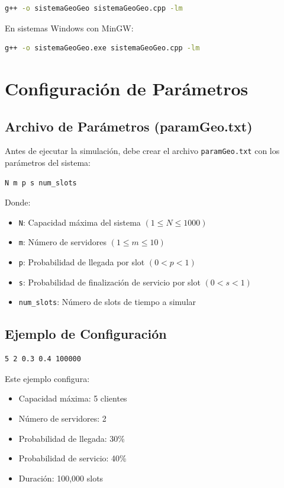 \documentclass{article}
\begin{document}
\begin{lstlisting}[language=bash]
g++ -o sistemaGeoGeo sistemaGeoGeo.cpp -lm
\end{lstlisting}

En sistemas Windows con MinGW:
\begin{lstlisting}[language=bash]
g++ -o sistemaGeoGeo.exe sistemaGeoGeo.cpp -lm
\end{lstlisting}

\section{Configuración de Parámetros}

\subsection{Archivo de Parámetros (paramGeo.txt)}
Antes de ejecutar la simulación, debe crear el archivo \texttt{paramGeo.txt} con los parámetros del sistema:

\begin{lstlisting}
N m p s num_slots
\end{lstlisting}

Donde:
\begin{itemize}
    \item \texttt{N}: Capacidad máxima del sistema $(1 \leq N \leq 1000)$
    \item \texttt{m}: Número de servidores $(1 \leq m \leq 10)$
    \item \texttt{p}: Probabilidad de llegada por slot $(0 < p < 1)$
    \item \texttt{s}: Probabilidad de finalización de servicio por slot $(0 < s < 1)$
    \item \texttt{num\_slots}: Número de slots de tiempo a simular
\end{itemize}

\subsection{Ejemplo de Configuración}
\begin{lstlisting}
5 2 0.3 0.4 100000
\end{lstlisting}

Este ejemplo configura:
\begin{itemize}
    \item Capacidad máxima: 5 clientes
    \item Número de servidores: 2
    \item Probabilidad de llegada: 30\%
    \item Probabilidad de servicio: 40\%
    \item Duración: 100,000 slots
\end{itemize}
\end{document}
